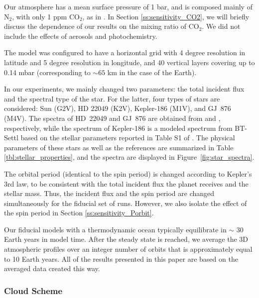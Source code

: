 \documentclass[11pt,numberedappendix,twocolappendix,]{emulateapj}
\begin{document}
Our atmosphere has a mean surface pressure of 1 bar, and is composed mainly of N$_2$, with only 1 ppm CO$_2$, as in \citet{Kopparapu2016}. 
In Section \ref{ss:sensitivity_CO2}, we will briefly discuss the dependence of our results on the mixing ratio of CO$_2$. 
We did not include the effects of aerosols and photochemistry. 

The model was configured to have a horizontal grid with 4 degree resolution in latitude and 5 degree resolution in longitude, and 40 vertical layers covering up to 0.14 mbar (corresponding to $\sim 65$ km in the case of the Earth). 

In our experiments, we mainly changed two parameters: the total incident flux and the spectral type of the star. 
For the latter, four types of stars are considered: 
Sun (G2V), 
HD 22049 (K2V), 
Kepler-186 (M1V), and 
GJ~876 (M4V). 
The spectra of HD~22049 and GJ~876 are obtained from \citet{Segura2003} and \citet{Domagal-Goldman2014}, respectively, 
while the spectrum of Kepler-186 is a modeled spectrum from BT-Settl \citep{Allard2012} based on the stellar parameters reported in Table S1 of \citet{Quintana2014}. 
The physical parameters of these stars as well as the references are summarized in Table \ref{tbl:stellar_properties}, and the spectra are displayed in Figure~\ref{fig:star_spectra}. 

The orbital period (identical to the spin period) is changed according to Kepler's 3rd law, to be consistent with the total incident flux the planet receives and the stellar mass. Thus, the incident flux and the spin period are changed simultaneously for the fiducial set of runs. 
However, we also isolate the effect of the spin period in Section \ref{ss:sensitivity_Porbit}. 

Our fiducial models with a thermodynamic ocean typically equilibrate in $\sim $ 30 Earth years in model time. 
After the steady state is reached, we average the 3D atmospheric profiles over an integer number of orbits that is approximately equal to 10 Earth years. 
All of the results presented in this paper are based on the averaged data created this way. 

\subsubsection{Cloud Scheme}
\end{document}
